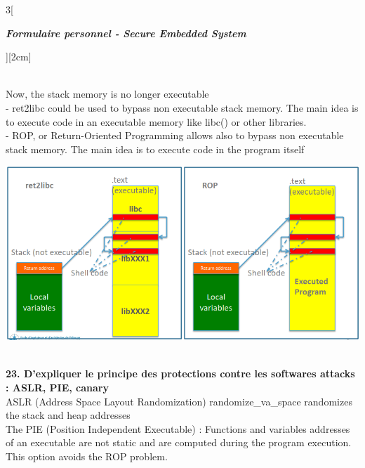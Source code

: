 \begin{multicols}{3}[\centerline{ \large\em \textbf{Formulaire personnel - Secure Embedded System}}][2cm]
\begin{minipage}{\linewidth}
\end{minipage}\\
Now, the stack memory is no longer executable\\
- ret2libc could be used to bypass non executable stack memory. The main idea is to execute code in an executable memory like libc() or other libraries.\\
- ROP, or Return-Oriented Programming allows also to bypass non executable stack memory. The main idea is to execute code in the program itself\\
\begin{minipage}{\linewidth}
	\centering
    \includegraphics[width =0.8\columnwidth]{images/7.png}
\end{minipage}
\\ \textbf{23. D’expliquer le principe des protections contre les softwares attacks : ASLR, PIE, canary\\}
ASLR (Address Space Layout Randomization) randomize\_va\_space randomizes
the stack and heap addresses\\
The PIE (Position Independent Executable) : Functions and variables addresses of an executable are not static and are computed during the program execution. This option avoids the ROP problem.\\


\end{multicols}
